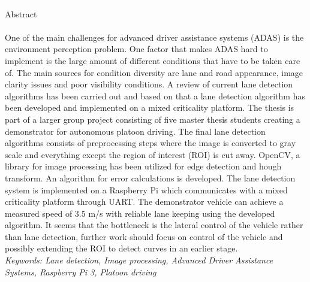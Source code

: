 \textcolor{white}{.}\\[0.5cm]
{\Large Abstract}\\
\textcolor{white}{.}\\
\label{sec:abstract}
\noindent
One of the main challenges for advanced driver assistance systems (ADAS) is the environment perception problem. One factor that makes ADAS hard to implement is the large amount of different conditions that have to be taken care of. The main sources for condition diversity are lane and road appearance, image clarity issues and poor visibility conditions. A review of current lane detection algorithms has been carried out and based on that a lane detection algorithm has been developed and implemented on a mixed criticality platform. The thesis is part of a larger group project consisting of five master thesis students creating a demonstrator for autonomous platoon driving. The final lane detection algorithms consists of preprocessing steps where the image is converted to gray scale and everything except the region of interest (ROI) is cut away. OpenCV, a library for image processing has been utilized for edge detection and hough transform. An algorithm for error calculations is developed. The lane detection system is implemented on a Raspberry Pi which communicates with a mixed criticality platform through UART. The demonstrator vehicle can achieve a measured speed of 3.5 m/s with reliable lane keeping using the developed algorithm. It seems that the bottleneck is the lateral control of the vehicle rather than lane detection, further work should focus on control of the vehicle and possibly extending the ROI to detect curves in an earlier stage.\\



\noindent
\textit{Keywords: Lane detection, Image processing, Advanced Driver Assistance Systems, Raspberry Pi 3, Platoon driving}

\setcounter{page}{1}
\vspace{0.25cm}
